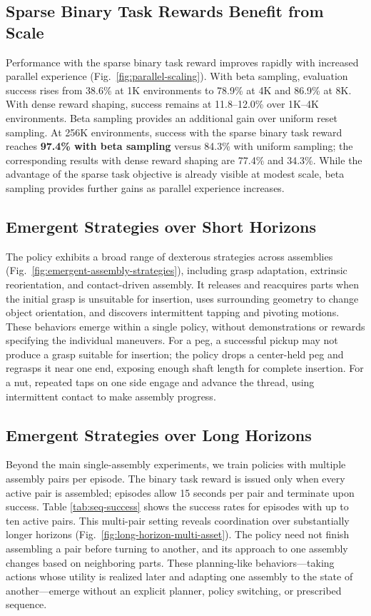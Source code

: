 \subsection{Sparse Binary Task Rewards Benefit from Scale}
Performance with the sparse binary task reward improves rapidly with increased parallel experience (Fig.~\ref{fig:parallel-scaling}).
With beta sampling, evaluation success rises from
38.6\% at 1K environments to 78.9\% at 4K and 86.9\% at 8K.
With dense reward shaping, success remains at 11.8--12.0\% over 1K--4K environments.
Beta sampling provides an additional gain over uniform reset sampling. At 256K environments, success with the sparse binary task reward reaches \textbf{97.4\% with beta sampling} versus 84.3\% with uniform sampling; the corresponding results with dense reward shaping are 77.4\% and 34.3\%. While the advantage of the sparse task objective is already visible at modest scale, beta sampling provides further gains as
parallel experience increases.

\subsection{Emergent Strategies over Short Horizons}

The policy exhibits a broad range of dexterous strategies across
assemblies (Fig.~\ref{fig:emergent-assembly-strategies}), including grasp adaptation, extrinsic reorientation, and contact-driven assembly. It releases and reacquires parts when the initial grasp is unsuitable for insertion, uses surrounding geometry to change object orientation, and discovers intermittent tapping and pivoting motions.
These behaviors emerge within a single policy, without demonstrations or rewards specifying the individual
maneuvers.
For a peg, a successful pickup may not produce a grasp suitable for insertion; the
policy drops a center-held peg and regrasps it near one end, exposing enough
shaft length for complete insertion. For a nut, repeated taps on one side engage
and advance the thread, using intermittent contact to make assembly progress.

\subsection{Emergent Strategies over Long Horizons}
Beyond the main single-assembly experiments, we train policies with multiple
assembly pairs per episode. The binary task reward is issued only when every
active pair is assembled; episodes allow 15 seconds per pair and terminate upon success. 
Table \ref{tab:seq-success} shows the success rates for episodes with up to ten active pairs.
This multi-pair setting reveals coordination over substantially longer horizons (Fig.~\ref{fig:long-horizon-multi-asset}). The policy need not finish
assembling a pair before turning to another, and its approach to
one assembly changes based on neighboring parts. 
These planning-like behaviors---taking actions whose utility is realized later and adapting one assembly to the state of another---emerge without an explicit planner, policy switching, or prescribed sequence.

